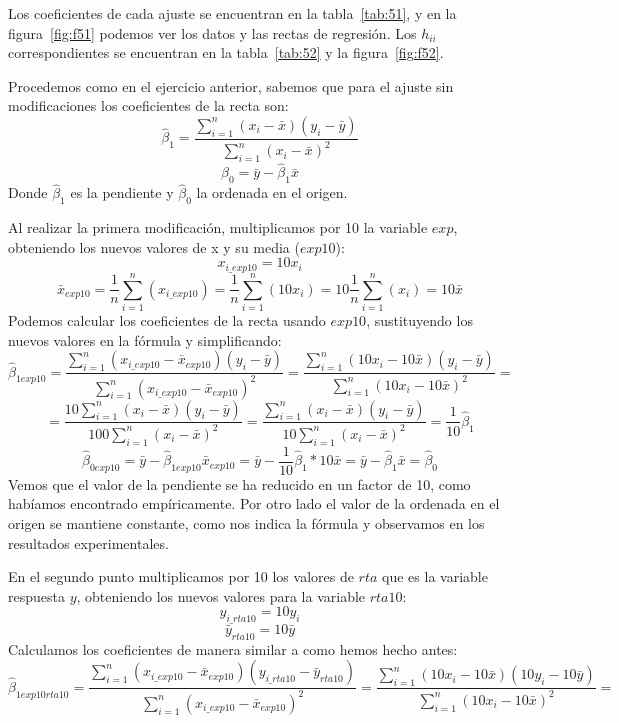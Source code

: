 \documentclass[a4paper]{article}
\begin{document}
Los coeficientes de cada ajuste se encuentran en la tabla~\ref{tab:51}, y en la figura~\ref{fig:f51} podemos ver los datos y las rectas de regresión. Los $h_{ii}$ correspondientes se encuentran en la tabla~\ref{tab:52} y la figura~\ref{fig:f52}. \par

Procedemos como en el ejercicio anterior, sabemos que para el ajuste sin modificaciones los coeficientes de la recta son: 
\[ \hat{\beta}_1 = \frac{\sum_{i=1}^n(x_i - \bar{x})(y_i - \bar{y})}{\sum_{i=1}^n(x_{i} - \bar{x})^2} \]
\[ \hat{\beta}_0 = \bar{y} - \hat{\beta}_1\bar{x}\]
Donde $\hat{\beta}_1$ es la pendiente y $\hat{\beta}_0$ la ordenada en el origen.\par
Al realizar la primera modificación, multiplicamos por 10 la variable $exp$, obteniendo los nuevos valores de x y su media ($exp10$): 
\[ x_{i\_exp10} = 10x_{i} \]
\[\bar{x}_{exp10} = \frac{1}{n}\sum_{i=1}^n(x_{i\_exp10}) = \frac{1}{n}\sum_{i=1}^n(10x_{i}) = 10\frac{1}{n}\sum_{i=1}^n(x_{i}) = 10\bar{x}\]
Podemos calcular los coeficientes de la recta usando $exp10$, sustituyendo los nuevos valores en la fórmula y simplificando: 
\[ \hat{\beta}_{1exp10} = \frac{\sum_{i=1}^n(x_{i\_exp10} - \bar{x}_{exp10})(y_i - \bar{y})}{\sum_{i=1}^n(x_{i\_exp10} - \bar{x}_{exp10})^2} = \frac{\sum_{i=1}^n(10x_{i} - 10\bar{x})(y_i - \bar{y})}{\sum_{i=1}^n(10x_{i} - 10\bar{x})^2} =  \]
\[ = \frac{10\sum_{i=1}^n(x_{i} - \bar{x})(y_i - \bar{y})}{100\sum_{i=1}^n(x_{i} - \bar{x})^2} = \frac{\sum_{i=1}^n(x_{i} - \bar{x})(y_i - \bar{y})}{10\sum_{i=1}^n(x_{i} - \bar{x})^2} = \frac{1}{10}\hat{\beta}_{1}  \]
\[ \hat{\beta}_{0exp10} = \bar{y} - \hat{\beta}_{1exp10}\bar{x}_{exp10} = \bar{y} - \frac{1}{10}\hat{\beta}_{1} * 10\bar{x} = \bar{y} - \hat{\beta}_{1}\bar{x} = \hat{\beta}_{0}\]
Vemos que el valor de la pendiente se ha reducido en un factor de 10, como habíamos encontrado empíricamente. Por otro lado el valor de la ordenada en el origen se mantiene constante, como nos indica la fórmula y observamos en los resultados experimentales. \par
En el segundo punto multiplicamos por 10 los valores de $rta$ que es la variable respuesta $y$, obteniendo los nuevos valores para la variable $rta10$:
\[ y_{i\_rta10} = 10y_{i}\]
\[\bar{y}_{rta10} = 10\bar{y}\]
Calculamos los coeficientes de manera similar a como hemos hecho antes:
\[ \hat{\beta}_{1exp10rta10} = \frac{\sum_{i=1}^n(x_{i\_exp10} - \bar{x}_{exp10})(y_{i\_rta10} - \bar{y}_{rta10})}{\sum_{i=1}^n(x_{i\_exp10} - \bar{x}_{exp10})^2} = \frac{\sum_{i=1}^n(10x_{i} - 10\bar{x})(10y_i - 10\bar{y})}{\sum_{i=1}^n(10x_{i} - 10\bar{x})^2} =  \]
\end{document}
